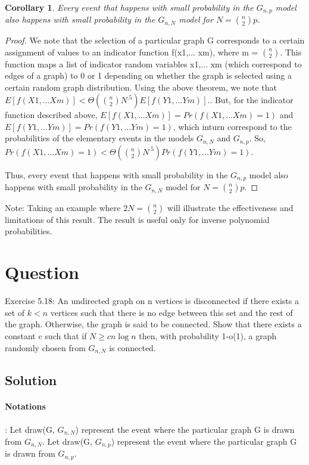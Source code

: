 \documentclass[10pt]{article}
\begin{document}
\newtheorem{cor}{Corollary}
\begin{cor}\label{The main result}
Every event that happens with small probability in the $G_{n,p}$ model also happens with small probability in the $G_{n,N}$ model for $N=\binom{n}{2}p$.
\end{cor}
\begin{proof}
We note that the selection of a particular graph G corresponds to a certain assignment of values to an indicator function f(x1,... xm), where m = $\binom{n}{2}$. This function maps a list of indicator random variables x1,... xm (which correspond to edges of a graph) to 0 or 1 depending on whether the graph is selected using a certain random graph distribution. Using the above theorem, we note that $E[f(X1,... Xm)] < \Theta(\binom{n}{2}N^{.5}) E[f(Y1,... Ym)]$.. But, for the indicator function described above, $E[f(X1,... Xm)]=Pr(f(X1,... Xm)=1)$ and $E[f(Y1,... Ym)]=Pr(f(Y1,... Ym)=1)$, which inturn correspond to the probabilities of the elementary events in the models $G_{n,N}$ and $G_{n,p}$. So, $Pr(f(X1,... Xm)=1) < \Theta(\binom{n}{2}N^{.5}) Pr(f(Y1,... Ym)=1)$.

Thus, every event that happens with small probability in the $G_{n,p}$ model also happens with small probability in the $G_{n,N}$ model for $N=\binom{n}{2}p$.
\end{proof}

Note: Taking an example where $2N=\binom{n}{2}$ will illustrate the effectiveness and limitations of this result. The result is useful only for inverse polynomial probabilities.

\section{Question}
Exercise 5.18: An undirected graph on n vertices is disconnected if there exists a set of $k<n$ vertices such that there is no edge between this set and the rest of the graph. Otherwise, the graph is said to be connected. Show that there exists a constant c such that if $N\geq cn \log n$ then, with probability 1-o(1), a graph randomly chosen from $G_{n,N}$ is connected.

\subsection{Solution}

\paragraph{Notations}: Let draw(G, $G_{n,N}$) represent the event where the particular graph G is drawn from $G_{n,N}$. Let draw(G, $G_{n,p}$) represent the event where the particular graph G is drawn from $G_{n,p}$.
\end{document}

